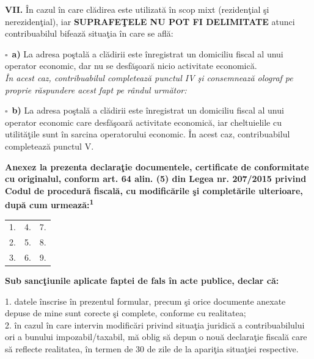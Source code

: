 \documentclass[10pt,a4paper]{article}
\newcommand{\checkboxempty}{$\square$}
\begin{document}
\vspace{0.3cm}

\textbf{VII.} În cazul în care clădirea este utilizată în scop mixt (rezidenţial şi nerezidenţial), iar \textbf{SUPRAFEŢELE NU POT FI DELIMITATE} atunci contribuabilul bifează situaţia în care se află:

\vspace{0.2cm}

\checkboxempty\ \textbf{a)} La adresa poştală a clădirii este înregistrat un domiciliu fiscal al unui operator economic, dar nu se desfăşoară nicio activitate economică.\\
\textit{În acest caz, contribuabilul completează punctul IV şi consemnează olograf pe proprie răspundere acest fapt pe rândul următor:}\\
\hrulefill

\vspace{0.2cm}

\checkboxempty\ \textbf{b)} La adresa poştală a clădirii este înregistrat un domiciliu fiscal al unui operator economic care desfăşoară activitate economică, iar cheltuielile cu utilităţile sunt în sarcina operatorului economic. În acest caz, contribuabilul completează punctul V.

\vspace{0.4cm}

\textbf{Anexez la prezenta declaraţie documentele, certificate de conformitate cu originalul, conform art. 64 alin. (5) din Legea nr. 207/2015 privind Codul de procedură fiscală, cu modificările şi completările ulterioare, după cum urmează:\textsuperscript{1}}

\vspace{0.2cm}

\begin{tabularx}{\textwidth}{XXX}
1. \hrulefill & 4. \hrulefill & 7. \hrulefill \\
2. \hrulefill & 5. \hrulefill & 8. \hrulefill \\
3. \hrulefill & 6. \hrulefill & 9. \hrulefill \\
\end{tabularx}

\vspace{0.3cm}

\textbf{Sub sancţiunile aplicate faptei de fals în acte publice, declar că:}

\vspace{0.1cm}

1. datele înscrise în prezentul formular, precum şi orice documente anexate depuse de mine sunt corecte şi complete, conforme cu realitatea;\\
2. în cazul în care intervin modificări privind situaţia juridică a contribuabilului ori a bunului impozabil/taxabil, mă oblig să depun o nouă declaraţie fiscală care să reflecte realitatea, în termen de 30 de zile de la apariţia situaţiei respective.
\end{document}
